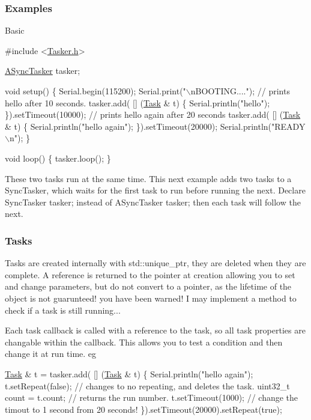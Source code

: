 \subsubsection*{Examples}

Basic 
\begin{DoxyCode}
\textcolor{preprocessor}{#include <\hyperlink{_tasker_8h}{Tasker.h}>}

\hyperlink{class_tasker}{ASyncTasker} tasker; 

\textcolor{keywordtype}{void} setup() \{
  Serial.begin(115200);
  Serial.print(\textcolor{stringliteral}{"\(\backslash\)nBOOTING...."});
    \textcolor{comment}{// prints hello after 10 seconds. }
    tasker.add( [] (\hyperlink{class_task}{Task} & t) \{
        Serial.println(\textcolor{stringliteral}{"hello"}); 
    \}).setTimeout(10000); 
   \textcolor{comment}{// prints hello again after 20 seconds }
    tasker.add( [] (\hyperlink{class_task}{Task} & t) \{
        Serial.println(\textcolor{stringliteral}{"hello again"}); 
    \}).setTimeout(20000);  
Serial.println(\textcolor{stringliteral}{"READY\(\backslash\)n"});
\}

\textcolor{keywordtype}{void} loop() \{
tasker.loop();
\}
\end{DoxyCode}


These two tasks run at the same time. This next example adds two tasks to a Sync\+Tasker, which waits for the first task to run before running the next. Declare {\ttfamily Sync\+Tasker tasker;} instead of {\ttfamily A\+Sync\+Tasker tasker;} then each task will follow the next. \subsubsection*{Tasks}

Tasks are created internally with std\+::unique\+\_\+ptr, they are deleted when they are complete. A reference is returned to the pointer at creation allowing you to set and change parameters, but do not convert to a pointer, as the lifetime of the object is not guarunteed! you have been warned! I may implement a method to check if a task is still running...

Each task callback is called with a reference to the task, so all task properties are changable within the callback. This allows you to test a condition and then change it at run time. eg 
\begin{DoxyCode}
\hyperlink{class_task}{Task} & t = tasker.add( [] (\hyperlink{class_task}{Task} & t) \{
     Serial.println(\textcolor{stringliteral}{"hello again"}); 
     t.setRepeat(\textcolor{keyword}{false}); \textcolor{comment}{//  changes to no repeating, and deletes the task.}
     uint32\_t count = t.count; \textcolor{comment}{// returns the run number. }
     t.setTimeout(1000); \textcolor{comment}{//  change the timout to 1 second from 20 seconds! }
 \}).setTimeout(20000).setRepeat(\textcolor{keyword}{true}); 
\end{DoxyCode}



